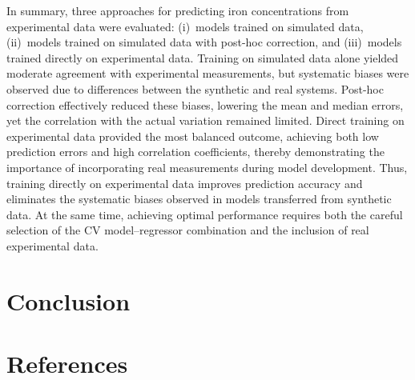 \documentclass[10pt]{iopart}
\begin{document}
In summary, three approaches for predicting iron concentrations from experimental data were evaluated: 
(i)~models trained on simulated data, 
(ii)~models trained on simulated data with post-hoc correction, 
and (iii)~models trained directly on experimental data. 
Training on simulated data alone yielded moderate agreement with experimental measurements, 
but systematic biases were observed due to differences between the synthetic and real systems. 
Post-hoc correction effectively reduced these biases, lowering the mean and median errors, 
yet the correlation with the actual variation remained limited. 
Direct training on experimental data provided the most balanced outcome, 
achieving both low prediction errors and high correlation coefficients, 
thereby demonstrating the importance of incorporating real measurements during model development.
Thus, training directly on experimental data improves prediction accuracy and eliminates the systematic biases observed in models transferred from synthetic data.
At the same time, achieving optimal performance requires both the careful selection of the CV model–regressor combination and the inclusion of real experimental data. 
 

\section{Conclusion}

\section*{References}



\end{document}
